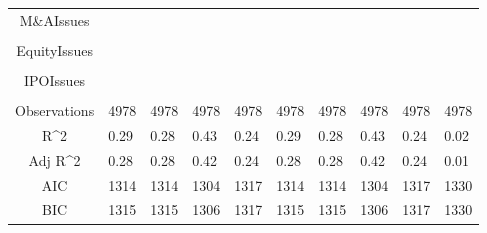 \documentclass{article}
\begin{document}
\begin{table}[H]
\begin{tabular}{|clllllllll|}
  M\&AIssues &  &  &  &  &  &  &  &  &  \\ 
   &  &  &  &  &  &  &  &  &  \\ 
  EquityIssues &  &  &  &  &  &  &  &  &  \\ 
   &  &  &  &  &  &  &  &  &  \\ 
  IPOIssues &  &  &  &  &  &  &  &  &  \\ 
   &  &  &  &  &  &  &  &  &  \\ 
  \hline 
 Observations & 4978 & 4978 & 4978 & 4978 & 4978 & 4978 & 4978 & 4978 & 4978 \\ 
  R^2 & 0.29 & 0.28 & 0.43 & 0.24 & 0.29 & 0.28 & 0.43 & 0.24 & 0.02 \\ 
  Adj R^2 & 0.28 & 0.28 & 0.42 & 0.24 & 0.28 & 0.28 & 0.42 & 0.24 & 0.01 \\ 
  AIC & 1314 & 1314 & 1304 & 1317 & 1314 & 1314 & 1304 & 1317 & 1330 \\ 
  BIC & 1315 & 1315 & 1306 & 1317 & 1315 & 1315 & 1306 & 1317 & 1330 \\ 
   \hline
\end{tabular}
 
\end{table}
\end{document}
